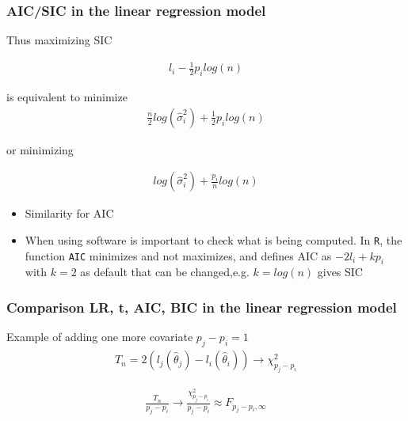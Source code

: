 \documentclass[
  shownotes,
  xcolor={svgnames},
  hyperref={colorlinks,citecolor=DarkBlue,linkcolor=DarkRed,urlcolor=DarkBlue}
  , aspectratio=169]{beamer}
\begin{document}
\begin{frame}[fragile]
\frametitle{AIC/SIC in the linear regression model}
Thus maximizing SIC

\begin{align}
l_i - \frac{1}{2} p_i log(n)
\end{align}

is equivalent to minimize
\begin{align}
\frac{n}{2}log(\hat \sigma_i^2) + \frac{1}{2} p_i log(n)
\end{align}

or minimizing

\begin{align}
log(\hat \sigma_i^2) + \frac{p_i}{n}  log(n)
\end{align}
\begin{itemize}
  \item Similarity for AIC
  \item When using software is important to check what is being computed. In \texttt{R}, the function \texttt{AIC} minimizes and not maximizes, and defines AIC as $-2l_i+kp_i$ with $k=2$ as default that can be changed,e.g. $k=log(n)$ gives SIC
\end{itemize}

 \end{frame}
\begin{frame}[fragile]
\frametitle{Comparison LR, t, AIC, BIC in the linear regression model}

Example of adding one more covariate $p_j-p_i =1$
\begin{align}
T_n=2(l_j(\hat \theta_j)-l_i(\hat \theta_i)) \rightarrow \chi^2_{p_j-p_i}
\end{align}

\begin{align}
\frac{T_n}{p_j-p_i} \rightarrow \frac{\chi^2_{p_j-p_i}}{p_j-p_i}\approx F_{p_j-p_i,\infty}
\end{align}
 \end{frame}
\end{document}
